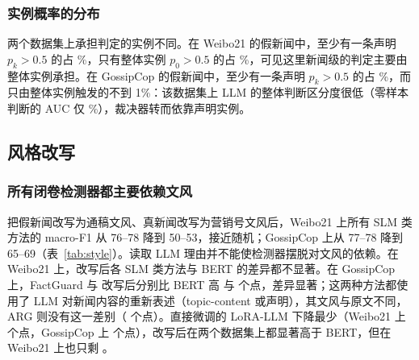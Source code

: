 \subsubsection{实例概率的分布}
两个数据集上承担判定的实例不同。在 Weibo21 的假新闻中，至少有一条声明 $p_k>0.5$ 的占 \%，只有整体实例 $p_0>0.5$ 的占 \%，可见这里新闻级的判定主要由整体实例承担。在 GossipCop 的假新闻中，至少有一条声明 $p_k>0.5$ 的占 \%，而只由整体实例触发的不到 1\%：该数据集上 LLM 的整体判断区分度很低（零样本判断的 AUC 仅 \%），裁决器转而依靠声明实例。

\subsection{风格改写}\label{sec:exp-style}

\begin{table}[htbp]
\centering\small
\caption{风格改写前后的 macro-F1（\%）}\label{tab:style}
\end{table}

\subsubsection{所有闭卷检测器都主要依赖文风}
把假新闻改写为通稿文风、真新闻改写为营销号文风后，Weibo21 上所有 SLM 类方法的 macro-F1 从 76--78 降到 50--53，接近随机；GossipCop 上从 77--78 降到 65--69（表~\ref{tab:style}）。读取 LLM 理由并不能使检测器摆脱对文风的依赖。在 Weibo21 上，改写后各 SLM 类方法与 BERT 的差异都不显著。在 GossipCop 上，FactGuard 与 \method{} 改写后分别比 BERT 高  与  个点，差异显著；这两种方法都使用了 LLM 对新闻内容的重新表述（topic-content 或声明），其文风与原文不同，ARG 则没有这一差别（ 个点）。直接微调的 LoRA-LLM 下降最少（Weibo21 上  个点，GossipCop 上  个点），改写后在两个数据集上都显著高于 BERT，但在 Weibo21 上也只剩 。

